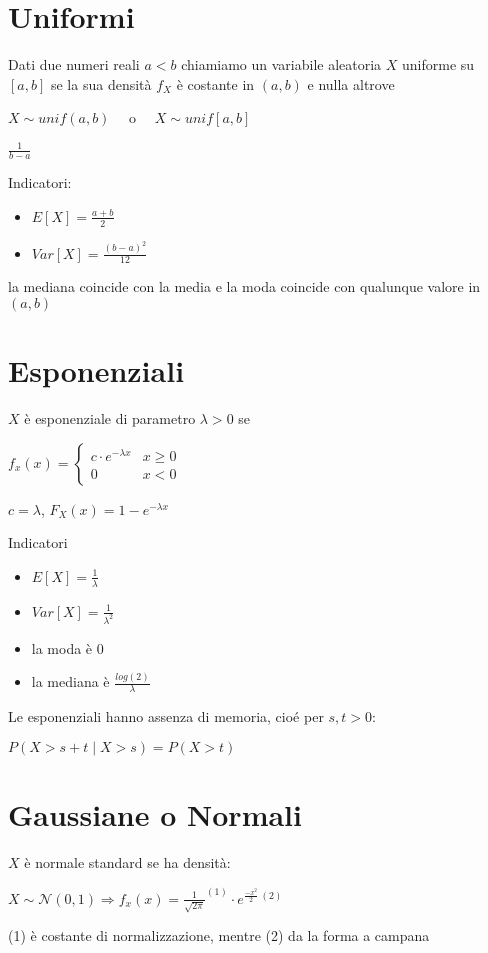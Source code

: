 \documentclass[11pt, letterpaper]{article}
\begin{document}
\section{Uniformi}
Dati due numeri reali $a<b$ chiamiamo un variabile aleatoria $X$ uniforme su $[a,b]$ se 
la sua densità $f_{X}$ è costante in $(a,b)$ e nulla altrove
\begin{center}
    $X\sim unif(a,b)\quad$ o $\quad X\sim unif[a,b]$

    $\frac{1}{b-a}$
\end{center}

Indicatori:
\begin{itemize}
    \item $E[X]=\frac{a+b}{2}$
    \item $Var[X]=\frac{(b-a)^{2}}{12}$
\end{itemize}
la mediana coincide con la media e la moda coincide con qualunque valore in $(a,b)$

\section{Esponenziali}
$X$ è esponenziale di parametro $\lambda>0$ se
\begin{center}
    $f_{x}(x)=\begin{cases}
        c\cdot e^{-\lambda x} & x\geq 0\\
        0 & x<0
    \end{cases}$
\end{center}
$c=\lambda$, $F_{X}(x)=1-e^{-\lambda x}$

Indicatori
\begin{itemize}
    \item $E[X]=\frac{1}{\lambda}$
    \item $Var[X]=\frac{1}{\lambda^{2}}$
    \item la moda è $0$
    \item la mediana è $\frac{log(2)}{\lambda}$
\end{itemize}
Le esponenziali hanno assenza di memoria, cioé per $s,t>0$:
\begin{center}
    $P(X>s+t\mid X>s)=P(X>t)$
\end{center}

\newpage
\thispagestyle{fancy}
\section{Gaussiane o Normali} $X$ è normale standard se ha densità:
\begin{center}
     $X\sim \mathcal{N}(0,1)\Rightarrow f_{x}(x)=\frac{1}{\sqrt{2\pi}}^{(1)}\cdot e^{\frac{-x^{2}}{2}\ (2)}$
\end{center}
(1) è costante di normalizzazione, mentre (2) da la forma a campana
\end{document}
